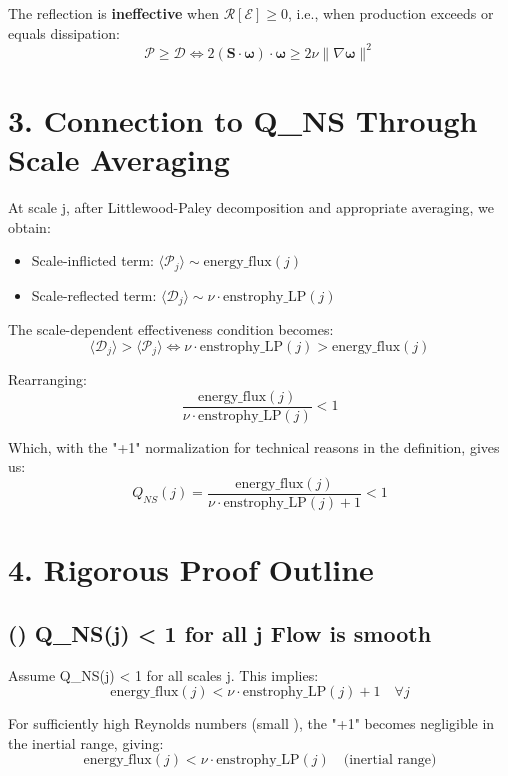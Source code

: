 \documentclass[11pt]{article}
\begin{document}
The reflection is \textbf{ineffective} when \(\mathcal{R}[\mathcal{E}] \geq 0\), i.e., when production exceeds or equals dissipation:
\[
\mathcal{P} \geq \mathcal{D} \iff 2(\mathbf{S} \cdot \boldsymbol{\omega}) \cdot \boldsymbol{\omega} \geq 2\nu \|\nabla \boldsymbol{\omega}\|^2
\]

\section{3. Connection to Q_{NS} Through Scale Averaging}

At scale j, after Littlewood-Paley decomposition and appropriate averaging, we obtain:
\begin{itemize}
\item Scale-inflicted term: \(\langle \mathcal{P}_j \rangle \sim \text{energy\_flux}(j)\)
\item Scale-reflected term: \(\langle \mathcal{D}_j \rangle \sim \nu \cdot \text{enstrophy\_LP}(j)\)
\end{itemize}

The scale-dependent effectiveness condition becomes:
\[
\langle \mathcal{D}_j \rangle > \langle \mathcal{P}_j \rangle \iff \nu \cdot \text{enstrophy\_LP}(j) > \text{energy\_flux}(j)
\]

Rearranging:
\[
\frac{\text{energy\_flux}(j)}{\nu \cdot \text{enstrophy\_LP}(j)} < 1
\]

Which, with the "+1" normalization for technical reasons in the definition, gives us:
\[
Q_{NS}(j) = \frac{\text{energy\_flux}(j)}{\nu \cdot \text{enstrophy\_LP}(j) + 1} < 1
\]

\section{4. Rigorous Proof Outline}

\subsection{(\Rightarrow) Q_{NS}(j) < 1 for all j \Rightarrow Flow is smooth}

Assume Q_{NS}(j) < 1 for all scales j. This implies:
\[
\text{energy\_flux}(j) < \nu \cdot \text{enstrophy\_LP}(j) + 1 \quad \forall j
\]

For sufficiently high Reynolds numbers (small \nu), the "+1" becomes negligible in the inertial range, giving:
\[
\text{energy\_flux}(j) < \nu \cdot \text{enstrophy\_LP}(j) \quad \text{(inertial range)}
\]
\end{document}
